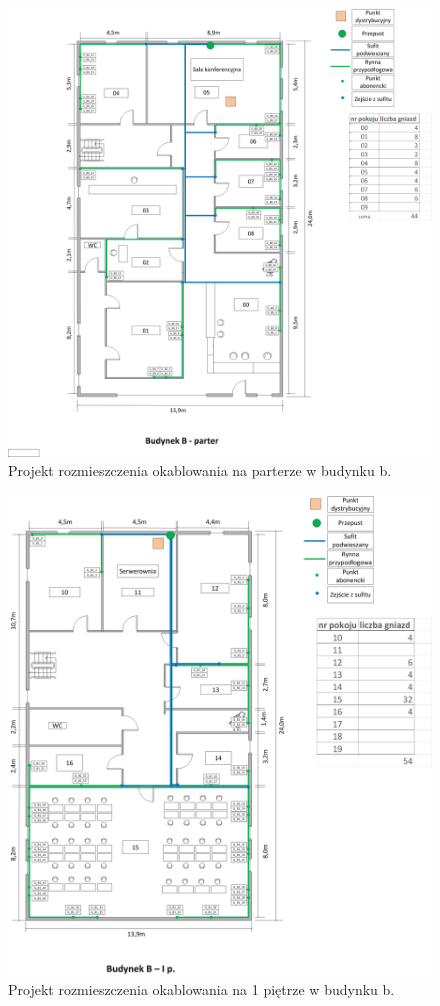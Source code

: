 \documentclass{report}
\begin{document}
\begin{figure}[H]
  \centering
      \includegraphics[width=\textwidth]{./obrazki/kable/b0.png}
  \caption{Projekt rozmieszczenia okablowania na parterze w budynku b.}
\end{figure}

\begin{figure}[H]
  \centering
      \includegraphics[width=\textwidth]{./obrazki/kable/b1.png}
  \caption{Projekt rozmieszczenia okablowania na 1 piętrze w budynku b.}
\end{figure}
\end{document}
